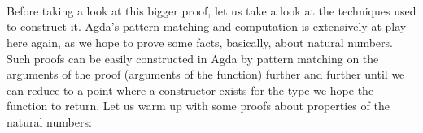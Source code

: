{\begin{code}%
\>[0]\AgdaSpace{}%
\AgdaSymbol{:}%
\>[955I]\AgdaSymbol{(}\AgdaSpace{}%
\AgdaSymbol{:}\AgdaSpace{}%
\AgdaSymbol{)}\AgdaSpace{}%
\<%
\\
\>[.]\<[955I]%
\>[10]\AgdaSpace{}%
\AgdaSymbol{(}\AgdaSpace{}%
\AgdaSymbol{)}\AgdaSpace{}%
\AgdaSymbol{(}\AgdaSpace{}%
\AgdaSymbol{)}\<%
\\
%
\>[10]\<%
\\
%
\>[10]\AgdaSpace{}%
\AgdaSymbol{(}\AgdaSpace{}%
\AgdaSymbol{(}\AgdaSpace{}%
\AgdaSymbol{))}\AgdaSpace{}%
\AgdaSymbol{(}\AgdaSpace{}%
\AgdaSymbol{(}\AgdaSpace{}%
\AgdaSymbol{))}\<%
\end{code}

Before taking a look at this bigger proof, let us take a look at the techniques used to construct it. Agda's pattern matching and computation is extensively at play here again, as we hope to prove some facts, basically, about natural numbers. Such proofs can be easily constructed in Agda by pattern matching on the arguments of the proof (arguments of the function) further and further until we can reduce to a point where a constructor exists for the type we hope the function to return. Let us warm up with some proofs about properties of the natural numbers:

}
